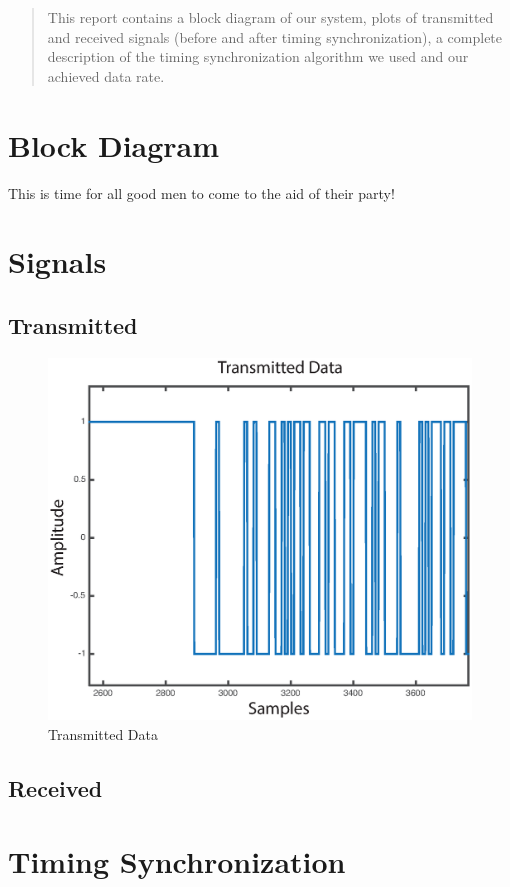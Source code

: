 \documentclass[12pt]{article}
\begin{document}
\maketitle

\begin{abstract}
This report contains a block diagram of our system, plots of transmitted and received signals (before and after timing synchronization), a complete description of the timing synchronization algorithm we used and our achieved data rate.
\end{abstract}

\section{Block Diagram}
This is time for all good men to come to the aid of their party!

\section{Signals}
\subsection{Transmitted}
\begin{figure}[!ht]
\centering
\includegraphics[width=.8\textwidth]{tx.eps}
\caption{Transmitted Data}
\label{fig:tx}
\end{figure}
    
\subsection{Received}

\section{Timing Synchronization}
\end{document}
